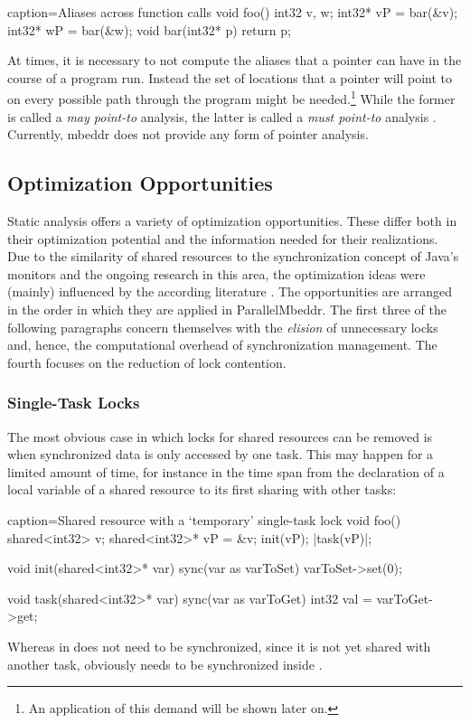 \begin{ccode}{caption=Aliases across function calls}
void foo() {
  int32 v, w;
  int32* vP = bar(&v);
  int32* wP = bar(&w);
}
void bar(int32* p) {
  return p;
}
\end{ccode}
At times, it is necessary to not compute the aliases that a pointer can have in the course of a program run. Instead the set of locations that a pointer will point to on every possible path through the program might be needed.\footnote{An application of this demand will be shown later on.} While the former is called a \textit{may point-to} analysis, the latter is called a \textit{must point-to} analysis \cite{ProgramAnalysisAndSpecialization}.
Currently, mbeddr does not provide any form of pointer analysis.

\subsection{Optimization Opportunities}
Static analysis offers a variety of optimization opportunities. These differ both in their optimization potential and the information needed for their realizations. Due to the similarity of shared resources to the synchronization concept of Java's monitors and the ongoing research in this area, the optimization ideas were (mainly) influenced by the according literature \cite{StaticAnalysesForJava}\cite{JavaTheoryAndPractice}\cite{DoJava6Threading}. The opportunities are arranged in the order in which they are applied in ParallelMbeddr. The first three of the following paragraphs concern themselves with the \textit{elision} of unnecessary locks and, hence, the computational overhead of synchronization management. The fourth focuses on the reduction of lock contention.

\subsubsection{Single-Task Locks}
The most obvious case in which locks for shared resources can be removed is when synchronized data is only accessed by one task. This may happen for a limited amount of time, for instance in the time span from the declaration of a local variable of a shared resource to its first sharing with other tasks:
\begin{ccode}{caption=Shared resource with a `temporary' single-task lock}
void foo() {
  shared<int32> v;
  shared<int32>* vP = &v;
  init(vP);
  |task(vP)|;
}

void init(shared<int32>* var) {
  sync(var as varToSet) {
    varToSet->set(0);
  }
}

void task(shared<int32>* var) {
  sync(var as varToGet) {
    int32 val = varToGet->get;
  }
}
\end{ccode}
Whereas  in  does not need to be synchronized, since it is not yet shared with another task,  obviously needs to be synchronized inside .

